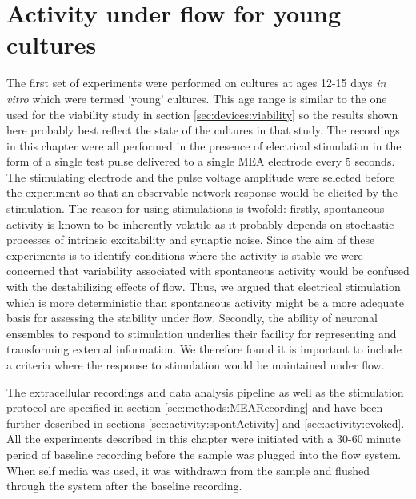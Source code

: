 \section{Activity under flow for young cultures}
        The first set of experiments were performed on cultures at ages 12-15 days \textit{in vitro} which were termed `young' cultures. This age range is similar to the one used for the viability study in section \ref{sec:devices:viability} so the results shown here probably best reflect the state of the cultures in that study. The recordings in this chapter were all performed in the presence of electrical stimulation in the form of a single test pulse delivered to a single MEA electrode every 5 seconds. The stimulating electrode and the pulse voltage amplitude were selected before the experiment so that an observable network response would be elicited by the stimulation. The reason for using stimulations is twofold: firstly, spontaneous activity is known to be inherently volatile as it probably depends on stochastic processes of intrinsic excitability and synaptic noise. Since the aim of these experiments is to identify conditions where the activity is stable we were concerned that variability associated with spontaneous activity would be confused with the destabilizing effects of flow. Thus, we argued that electrical stimulation which is more deterministic than spontaneous activity might be a more adequate basis for assessing the stability under flow. Secondly, the ability of neuronal ensembles to respond to stimulation underlies their facility for representing and transforming external information. We therefore found it is important to include a criteria where the response to stimulation would be maintained under flow.

        The extracellular recordings and data analysis pipeline as well as the stimulation protocol are specified in section \ref{sec:methods:MEARecording} and have been further described in sections \ref{sec:activity:spontActivity} and \ref{sec:activity:evoked}. All the experiments described in this chapter were initiated with a 30-60 minute period of baseline recording before the sample was plugged into the flow system. When self media was used, it was withdrawn from the sample and flushed through the system after the baseline recording.

